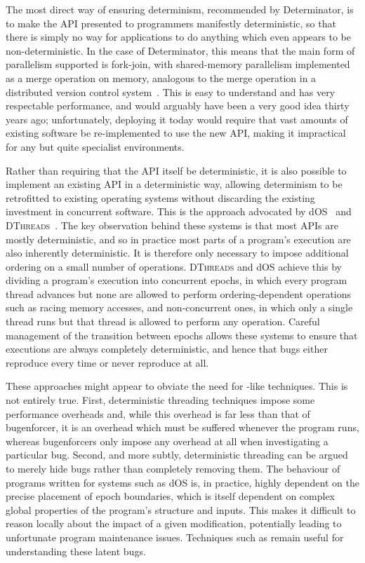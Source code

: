 The most direct way of ensuring determinism, recommended by
Determinator, is to make the API presented to programmers manifestly
deterministic, so that there is simply no way for applications to do
anything which even appears to be non-deterministic.  In the case of
Determinator, this means that the main form of parallelism supported
is fork-join, with shared-memory parallelism implemented as a merge
operation on memory, analogous to the merge operation in a distributed
version control system~\cite{FFFHamano2013}.  This is easy to
understand and has very respectable performance, and would arguably
have been a very good idea thirty years ago; unfortunately, deploying
it today would require that vast amounts of existing software be
re-implemented to use the new API, making it impractical for any but
quite specialist environments.

Rather than requiring that the API itself be deterministic, it is also
possible to implement an existing API in a deterministic way, allowing
determinism to be retrofitted to existing operating systems without
discarding the existing investment in concurrent software.  This is
the approach advocated by dOS~\cite{Bergan2010} and
\textsc{DThreads}~\cite{Liu2011}.  The key observation behind these
systems is that most APIs are mostly deterministic, and so in practice
most parts of a program's execution are also inherently deterministic.
It is therefore only necessary to impose additional ordering on a
small number of operations.  \textsc{DThreads} and dOS achieve this by
dividing a program's execution into concurrent epochs, in which every
program thread advances but none are allowed to perform
ordering-dependent operations such as racing memory accesses, and
non-concurrent ones, in which only a single thread runs but that
thread is allowed to perform any operation.  Careful management of the
transition between epochs allows these systems to ensure that
executions are always completely deterministic, and hence that bugs
either reproduce every time or never reproduce at all.

These approaches might appear to obviate the need for
{\technique}-like techniques.  This is not entirely true.  First,
deterministic threading techniques impose some performance overheads
and, while this overhead is far less than that of {\atechnique}
\gls{bugenforcer}, it is an overhead which must be suffered whenever
the program runs, whereas \glspl{bugenforcer} only impose any overhead
at all when investigating a particular bug.  Second, and more subtly,
deterministic threading can be argued to merely hide bugs rather than
completely removing them.  The behaviour of programs written for
systems such as dOS is, in practice, highly dependent on the precise
placement of epoch boundaries, which is itself dependent on complex
global properties of the program's structure and inputs.  This makes
it difficult to reason locally about the impact of a given
modification, potentially leading to unfortunate program maintenance
issues.  Techniques such as {\technique} remain useful for
understanding these latent bugs.

